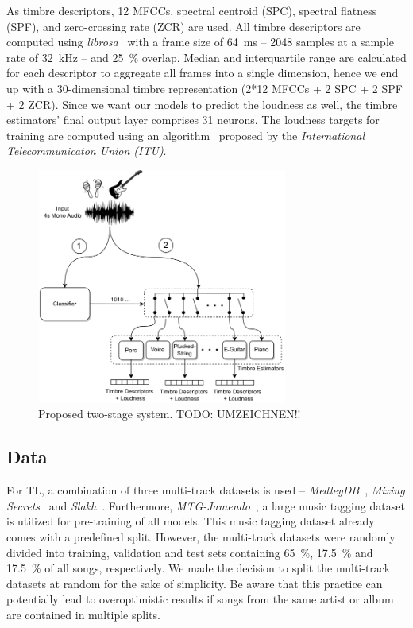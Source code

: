\documentclass{article}
\begin{document}
As timbre descriptors, 12 MFCCs, spectral centroid (SPC), spectral flatness (SPF), and zero-crossing rate (ZCR) are used. All timbre descriptors are computed using \textit{librosa}~\cite{mcfee2015librosa} with a frame size of \SI{64}{\milli\second} -- 2048 samples at a sample rate of \SI{32}{\kilo\hertz} -- and \SI{25}{\percent} overlap. Median and interquartile range are calculated for each descriptor to aggregate all frames into a single dimension, hence we end up with a 30-dimensional timbre representation (2*12 MFCCs + 2 SPC + 2 SPF + 2 ZCR). Since we want our models to predict the loudness as well, the timbre estimators' final output layer comprises 31 neurons. The loudness targets for training are computed using an algorithm~\cite{itu2015recommendation} proposed by the \textit{International Telecommunicaton Union (ITU)}.
\begin{figure}[t]
	\begin{minipage}[b]{1.0\linewidth}
		\centering
		\centerline{\includegraphics[width=8.25cm,height=7.75cm]{two-stage_system(small).png}}
	\end{minipage}
	\centering
	\caption{Proposed two-stage system. TODO: UMZEICHNEN!!}
	\label{fig:system}
	\vspace*{-0.05cm}	
\end{figure}

\subsection{Data}
\label{sec:method:data}
For TL, a combination of three multi-track datasets is used -- \textit{MedleyDB}~\cite{bittner2014medleydb}, \textit{Mixing Secrets}~\cite{gururani2017mixingsecrets} and \textit{Slakh}~\cite{manilow2019slakh}. Furthermore, \textit{MTG-Jamendo}~\cite{bogdanov2019jamendo}, a large music tagging dataset is utilized for pre-training of all models. This music tagging dataset already comes with a predefined split. However, the multi-track datasets were randomly divided into training, validation and test sets containing \SI{65}{\percent}, \SI{17.5}{\percent} and \SI{17.5}{\percent} of all songs, respectively. We made the decision to split the multi-track datasets at random for the sake of simplicity. Be aware that this practice can potentially lead to overoptimistic results if songs from the same artist or album are contained in multiple splits.
\end{document}
